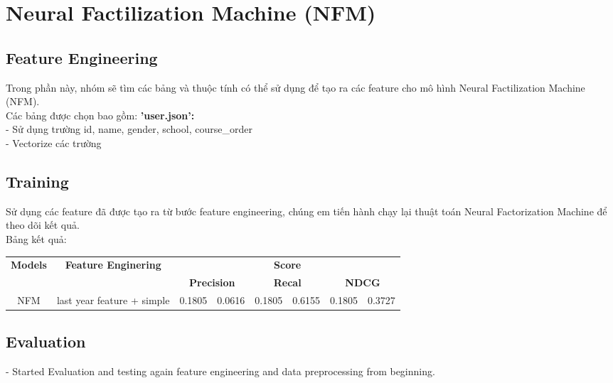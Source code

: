 \section{Neural Factilization Machine (NFM)}
\subsection{Feature Engineering}
Trong phần này, nhóm sẽ tìm các bảng và thuộc tính có thể sử dụng để tạo ra các feature cho mô hình Neural Factilization Machine (NFM).\\
Các bảng được chọn bao gồm:
\textbf{'user.json':}\\
- Sử dụng trường id, name, gender, school, course_order\\
- Vectorize các trường\\
\subsection{Training}
Sử dụng các feature đã được tạo ra từ bước feature engineering, chúng em tiến hành chạy lại thuật toán Neural Factorization Machine để theo dõi kết quả.\\
Bảng kết quả:
\begin{table}[]
    \begin{tabular}{ccclllll}
    \hline
    \multirow{2}{*}{\textbf{Models}} &
      \multirow{2}{*}{\textbf{Feature Enginering}} &
      \multicolumn{6}{c}{\textbf{Score}} \\ \cline{3-8} 
     &
       &
      \multicolumn{2}{c}{\textbf{Precision}} &
      \multicolumn{2}{c}{\textbf{Recal}} &
      \multicolumn{2}{c}{\textbf{NDCG}} \\ \hline
    NFM &
      \multicolumn{1}{l}{last year feature + simple} &
      \multicolumn{1}{l}{0.1805} &
      0.0616 &
      0.1805 &
      0.6155 &
      0.1805 &
      0.3727
\end{tabular}
\end{table}
\subsection{Evaluation}
- Started Evaluation and testing again feature engineering and data preprocessing from beginning.\\